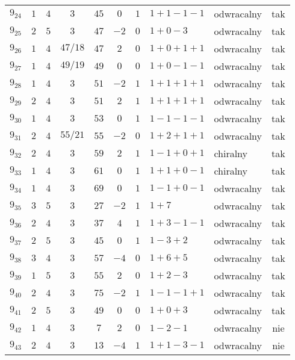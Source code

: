 \begin{longtable}{lccccccllc}
$9_{24}$   & $1$   & $4$ & $3$ & $45$  & $0$  & $1$ & $1+1-1-1$     & odwracalny & tak \\
$9_{25}$   & $2$   & $5$ & $3$ & $47$  & $-2$ & $0$ & $1+0-3$       & odwracalny & tak \\
$9_{26}$   & $1$   & $4$ & $47/18$ & $47$  & $2$  & $0$ & $1+0+1+1$     & odwracalny & tak \\
$9_{27}$   & $1$   & $4$ & $49/19$ & $49$  & $0$  & $0$ & $1+0-1-1$     & odwracalny & tak \\
$9_{28}$   & $1$   & $4$ & $3$ & $51$  & $-2$ & $1$ & $1+1+1+1$     & odwracalny & tak \\
$9_{29}$   & $2$   & $4$ & $3$ & $51$  & $2$  & $1$ & $1+1+1+1$     & odwracalny & tak \\
$9_{30}$   & $1$   & $4$ & $3$ & $53$  & $0$  & $1$ & $1-1-1-1$     & odwracalny & tak \\
$9_{31}$   & $2$   & $4$ & $55/21$ & $55$  & $-2$ & $0$ & $1+2+1+1$     & odwracalny & tak \\
$9_{32}$   & $2$   & $4$ & $3$ & $59$  & $2$  & $1$ & $1-1+0+1$     & chiralny   & tak \\
$9_{33}$   & $1$   & $4$ & $3$ & $61$  & $0$  & $1$ & $1+1+0-1$     & chiralny   & tak \\
$9_{34}$   & $1$   & $4$ & $3$ & $69$  & $0$  & $1$ & $1-1+0-1$     & odwracalny & tak \\
$9_{35}$   & $3$   & $5$ & $3$ & $27$  & $-2$ & $1$ & $1+7$         & odwracalny & tak \\
$9_{36}$   & $2$   & $4$ & $3$ & $37$  & $4$  & $1$ & $1+3-1-1$     & odwracalny & tak \\
$9_{37}$   & $2$   & $5$ & $3$ & $45$  & $0$  & $1$ & $1-3+2$       & odwracalny & tak \\
$9_{38}$   & $3$   & $4$ & $3$ & $57$  & $-4$ & $0$ & $1+6+5$       & odwracalny & tak \\
$9_{39}$   & $1$   & $5$ & $3$ & $55$  & $2$  & $0$ & $1+2-3$       & odwracalny & tak \\
$9_{40}$   & $2$   & $4$ & $3$ & $75$  & $-2$ & $1$ & $1-1-1+1$     & odwracalny & tak \\
$9_{41}$   & $2$   & $5$ & $3$ & $49$  & $0$  & $0$ & $1+0+3$       & odwracalny & tak \\
$9_{42}$   & $1$   & $4$ & $3$ & $7$   & $2$  & $0$ & $1-2-1$       & odwracalny & nie \\
$9_{43}$   & $2$   & $4$ & $3$ & $13$  & $-4$ & $1$ & $1+1-3-1$     & odwracalny & nie \\

\end{longtable}
